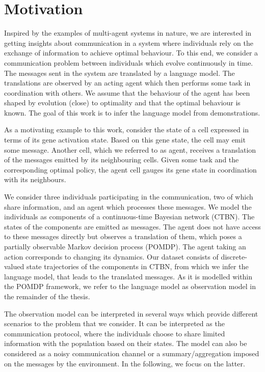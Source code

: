 \section{Motivation}
Inspired by the examples of multi-agent systems in nature, we are interested in getting insights about communication in a system where individuals rely on the exchange of information to achieve optimal behaviour. To this end, we consider a communication problem between individuals which evolve continuously in time. The messages sent in the system are translated by a language model. The translations are observed by an acting agent which then performs some task in coordination with others. We assume that the behaviour of the agent has been shaped by evolution (close) to optimality and that the optimal behaviour is known. The goal of this work is to infer the language model from demonstrations. \par
As a motivating example to this work, consider the state of a cell expressed in terms of its gene activation state. Based on this gene state, the cell may emit some message. Another cell, which we referred to as agent, receives a translation of the messages emitted by its neighbouring cells. Given some task and the corresponding optimal policy, the agent cell gauges its gene state in coordination with its neighbours.\par
We consider three individuals participating in the communication, two of which share information, and an agent which processes these messages. We model the individuals as components of a continuous-time Bayesian network (CTBN). The states of the components are emitted as messages. The agent does not have access to these messages directly but observes a translation of them, which poses a partially observable Markov decision process (POMDP). The agent taking an action corresponds to changing its dynamics. Our dataset consists of discrete-valued state trajectories of the components in CTBN, from which we infer the language model, that leads to the translated messages. As it is modelled within the POMDP framework, we refer to the language model as observation model in the remainder of the thesis.\par
The observation model can be interpreted in several ways which provide different scenarios to the problem that we consider. It can be interpreted as the communication protocol, where the individuals choose to share limited information with the population based on their states. The model can also be considered as a noisy communication channel or a summary/aggregation imposed on the messages by the environment. In the following, we focus on the latter.

